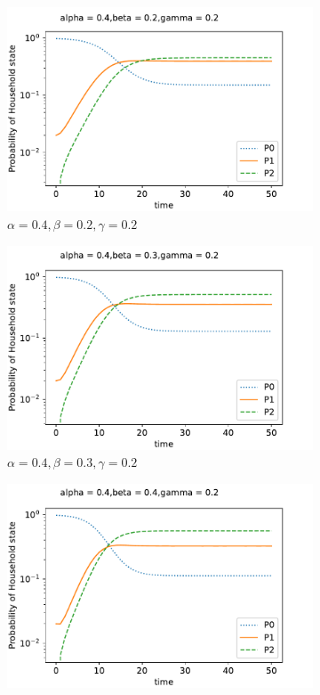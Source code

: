 \documentclass[paper=a4, fontsize=11pt, twoside, BCOR=12mm, parskip=full, listof=totoc]{scrreprt}
\begin{document}
{	\begin{figure}[H]
	\centering
	\begin{subfigure}[b]{0.4\linewidth}
	  \includegraphics[width=\linewidth]{sim/01g1.pdf}
	  \caption{\(\alpha=0.4, \beta=0.2, \gamma=0.2\)}
	  \label{beta two}
	\end{subfigure}
	\begin{subfigure}[b]{0.4\linewidth}
	  \includegraphics[width=\linewidth]{sim/022_g6.pdf}
	  \caption{\(\alpha=0.4, \beta=0.3, \gamma=0.2\)}
	  \label{beta three}
	\end{subfigure}
	\begin{subfigure}[b]{0.4\linewidth}
      \includegraphics[width=\linewidth]{sim/032_g11.pdf}

\end{subfigure}
\end{figure}}
\end{document}
